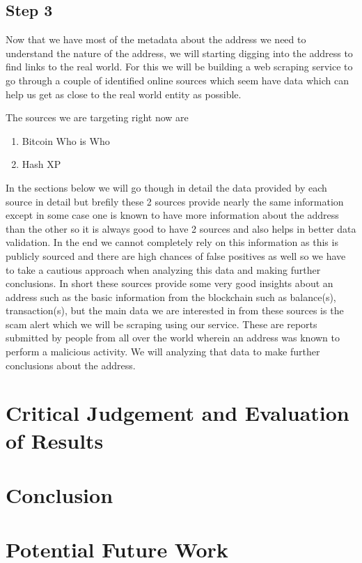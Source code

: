 \documentclass{article}
\begin{document}
    \subsection{Step 3}
        Now that we have most of the metadata about the address we need to understand the nature of the address, we will starting digging into the address to find links to the real world. For this we will be building a web scraping service to go through a couple of identified online sources which seem have data which can help us get as close to the real world entity as possible. 
        
        The sources we are targeting right now are 
        \begin{enumerate}
            \item Bitcoin Who is Who \cite{bitcoinwhoswho}
            \item Hash XP \cite{hashxp.org}
        \end{enumerate}
        In the sections below we will go though in detail the data provided by each source in detail but brefily these 2 sources provide nearly the same information except in some case one is known to have more information about the address than the other so it is always good to have 2 sources and also helps in better data validation. In the end we cannot completely rely on this information as this is publicly sourced and there are high chances of false positives as well so we have to take a cautious approach when analyzing this data and making further conclusions. 
        In short these sources provide some very good insights about an address such as the basic information from the blockchain such as balance(s), transaction(s), but the main data we are interested in from these sources is the scam alert which we will be scraping using our service. These are reports submitted by people from all over the world wherein an address was known to perform a malicious activity. We will analyzing that data to make further conclusions about the address.
        
\pagebreak
\section{Critical Judgement and Evaluation of Results}
\pagebreak
\section{Conclusion}
\pagebreak
\section{Potential Future Work}
\pagebreak

 
\end{document}
